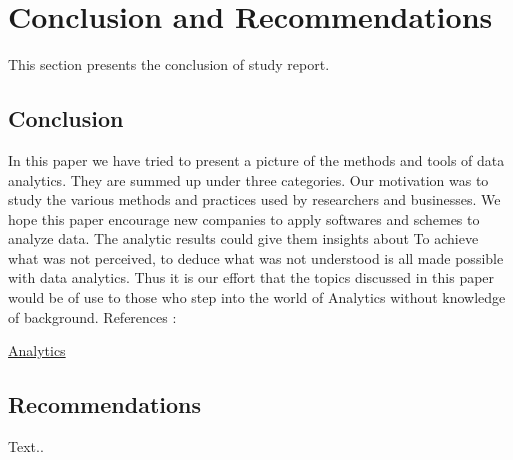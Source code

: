 \setlength{\footskip}{8mm}

\chapter{Conclusion and Recommendations}
\label{ch:conclusion}

This section presents the conclusion of study report.

\section{Conclusion}

In this paper we have tried to present a picture of the methods and tools of data analytics. They are summed up under three categories. Our motivation was to study the various methods and practices used by researchers and businesses.
We hope this paper encourage new companies to apply softwares and schemes to analyze data. The analytic results could give them insights about
To achieve what was not perceived, to deduce what was not understood is all made possible with data analytics. Thus it is our effort that the topics discussed in this paper would be of use to those who step into the world of Analytics without knowledge of background.
References :

\url{ Analytics}

\section{Recommendations}

Text..

\FloatBarrier

